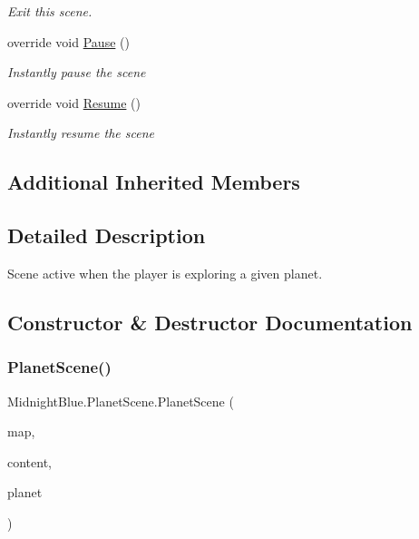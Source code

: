 \begin{DoxyCompactItemize}
\begin{DoxyCompactList}\small\item\em Exit this scene. \end{DoxyCompactList}\item 
override void \hyperlink{class_midnight_blue_1_1_planet_scene_abc077e1cd5f40879ca3af4224f0ff455}{Pause} ()
\begin{DoxyCompactList}\small\item\em Instantly pause the scene \end{DoxyCompactList}\item 
override void \hyperlink{class_midnight_blue_1_1_planet_scene_aa14750d3675b59462796e821b3921397}{Resume} ()
\begin{DoxyCompactList}\small\item\em Instantly resume the scene \end{DoxyCompactList}\end{DoxyCompactItemize}
\subsection*{Additional Inherited Members}


\subsection{Detailed Description}
Scene active when the player is exploring a given planet. 



\subsection{Constructor \& Destructor Documentation}
\hypertarget{class_midnight_blue_1_1_planet_scene_a50ee691836116a89ff549e519f895ba3}{}\label{class_midnight_blue_1_1_planet_scene_a50ee691836116a89ff549e519f895ba3} 
\subsubsection{\texorpdfstring{Planet\+Scene()}{PlanetScene()}}
{\footnotesize\ttfamily Midnight\+Blue.\+Planet\+Scene.\+Planet\+Scene (\begin{DoxyParamCaption}\item[{\hyperlink{class_m_b2_d_1_1_entity_component_1_1_entity_map}{Entity\+Map}}]{map,  }\item[{Content\+Manager}]{content,  }\item[{\hyperlink{class_midnight_blue_1_1_planet}{Planet}}]{planet }\end{DoxyParamCaption})\hspace{0.3cm}{\ttfamily [inline]}}



